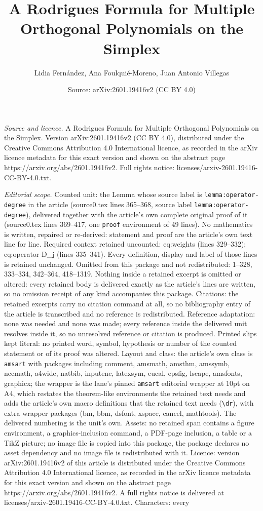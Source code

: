 \documentclass[10pt,a4paper]{amsart}
\title[A Rodrigues Formula for Multiple Orthogonal Polynomials on t]{A Rodrigues Formula for Multiple Orthogonal Polynomials on the Simplex}
\author{Lidia Fern\'andez, Ana Foulqui\'e-Moreno, Juan Antonio Villegas}
\date{Source: arXiv:2601.19416v2 (CC BY 4.0)}
\begin{document}
\maketitle

\noindent\emph{Source and licence.} A Rodrigues Formula for Multiple Orthogonal Polynomials on the Simplex. Version arXiv:2601.19416v2 (CC BY 4.0), distributed under the Creative Commons Attribution 4.0 International licence, as recorded in the arXiv licence metadata for this exact version and shown on the abstract page https://arxiv.org/abs/2601.19416v2. Full rights notice: licenses/arxiv-2601.19416-CC-BY-4.0.txt.\par\smallskip

\noindent\textit{Editorial scope.} Counted unit: the Lemma whose source label is \texttt{lemma:operator-degree} in the article (source0.tex lines 365--368, source label \texttt{lemma:operator-degree}), delivered together with the article's own complete original proof of it (source0.tex lines 369--417, one \texttt{proof} environment of 49 lines). No mathematics is written, repaired or re-derived: statement and proof are the article's own text line for line. Required context retained uncounted: eq:weights (lines 329--332); eq:operator-D\_j (lines 335--341). Every definition, display and label of those lines is retained unchanged. Omitted from this package and not redistributed: 1--328, 333--334, 342--364, 418--1319. Nothing inside a retained excerpt is omitted or altered: every retained body is delivered exactly as the article's lines are written, so no omission receipt of any kind accompanies this package. Citations: the retained excerpts carry no citation command at all, so no bibliography entry of the article is transcribed and no reference is redistributed. Reference adaptation: none was needed and none was made; every reference inside the delivered unit resolves inside it, so no unresolved reference or citation is produced. Printed slips kept literal: no printed word, symbol, hypothesis or number of the counted statement or of its proof was altered. Layout and class: the article's own class is \texttt{amsart} with packages including comment, amsmath, amsthm, amssymb, nccmath, a4wide, natbib, inputenc, latexsym, eucal, epsfig, lscape, amsfonts, graphicx; the wrapper is the lane's pinned \texttt{amsart} editorial wrapper at 10pt on A4, which restates the theorem-like environments the retained text needs and adds the article's own macro definitions that the retained text needs (\texttt{\textbackslash dr}), with extra wrapper packages (bm, bbm, dsfont, xspace, cancel, mathtools). The delivered numbering is the unit's own. Assets: no retained span contains a figure environment, a graphics-inclusion command, a PDF-page inclusion, a table or a TikZ picture; no image file is copied into this package, the package declares no asset dependency and no image file is redistributed with it. Licence: version arXiv:2601.19416v2 of this article is distributed under the Creative Commons Attribution 4.0 International licence, as recorded in the arXiv licence metadata for this exact version and shown on the abstract page https://arxiv.org/abs/2601.19416v2. A full rights notice is delivered at licenses/arxiv-2601.19416-CC-BY-4.0.txt. Characters: every 
\end{document}

